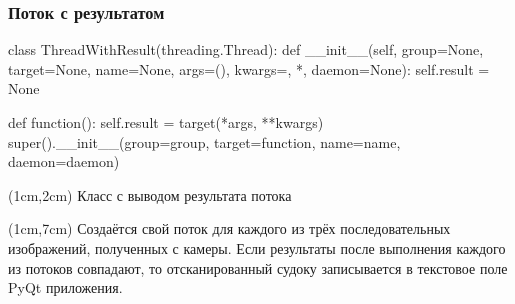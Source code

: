 \documentclass{beamer}
\begin{document}
\begin{frame}[fragile]
\frametitle{Поток с результатом}
\begin{pythoncode}
class ThreadWithResult(threading.Thread):
    def __init__(self, group=None, target=None, name=None,
                 args=(), kwargs={}, *, daemon=None):
        self.result = None

        def function():
            self.result = target(*args, **kwargs)
        super().__init__(group=group, target=function,
                         name=name, daemon=daemon)
\end{pythoncode}

\begin{textblock*}{8cm}(1cm,2cm)
Класс с выводом результата потока
\end{textblock*}

\begin{textblock*}{10cm}(1cm,7cm)
\footnotesize Создаётся свой поток для каждого из трёх последовательных изображений, полученных с камеры. Если результаты после выполнения каждого из потоков совпадают, то отсканированный судоку записывается в текстовое поле PyQt приложения.
\end{textblock*}

\end{frame}
\end{document}
